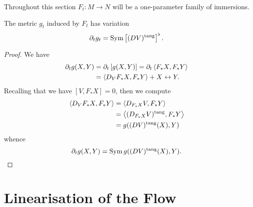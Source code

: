 Throughout this section \(F_t : M \to N\) will be a one-parameter family of immersions.

\begin{lemma}
The metric \(g_t\) induced by \(F_t\) has variation
\[
\partial_t g_t = \operatorname{Sym} \left[(DV)^{\operatorname{tang}}\right]^{\flat}.
\]
\end{lemma}

\begin{proof}
We have
\[
\begin{split}
\partial_t g (X, Y) &= \partial_t \left[g(X, Y)\right] = \partial_t \left\langle F_{\ast} X,F_{\ast} Y \right\rangle \\
&= \left\langle D_V F_{\ast} X,F_{\ast} Y \right\rangle + X \leftrightarrow Y.
\end{split}
\]
Recalling that we have \([V, F_{\ast} X] = 0\), then we compute
\[
\begin{split}
\left\langle D_V F_{\ast} X,F_{\ast} Y \right\rangle &= \left\langle D_{F_{\ast} X} V,F_{\ast} Y \right\rangle \\
&= \left\langle (D_{F_{\ast} X} V)^{\operatorname{tang}},F_{\ast} Y \right\rangle \\
&= g((DV)^{\operatorname{tang}} (X), Y)
\end{split}
\]
whence
\[
\partial_t g (X, Y) = \operatorname{Sym} g((DV)^{\operatorname{tang}} (X), Y).
\]
\end{proof}

\section{Linearisation of the Flow}